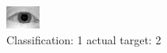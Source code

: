 \begin{figure}[h!]
\begin{center}
\includegraphics[width=0.60\columnwidth]{figures/ID931_class_1_target_2.png}
\end{center}
\caption{ Classification: 1 actual target: 2}
\label{fig:ID931_class_1_target_2}
\end{figure}
